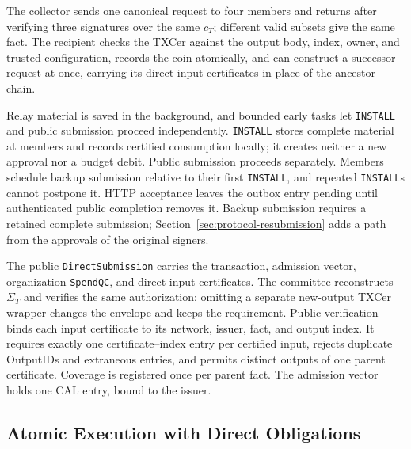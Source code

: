 The collector sends one canonical request to four members and returns after verifying three signatures over the same $c_T$; different valid subsets give the same fact. The recipient checks the TXCer against the output body, index, owner, and trusted configuration, records the coin atomically, and can construct a successor request at once, carrying its direct input certificates in place of the ancestor chain.

Relay material is saved in the background, and bounded early tasks let \texttt{INSTALL} and public submission proceed independently. \texttt{INSTALL} stores complete material at members and records certified consumption locally; it creates neither a new approval nor a budget debit. Public submission proceeds separately. Members schedule backup submission relative to their first \texttt{INSTALL}, and repeated \texttt{INSTALL}s cannot postpone it. HTTP acceptance leaves the outbox entry pending until authenticated public completion removes it. Backup submission requires a retained complete submission; Section~\ref{sec:protocol-resubmission} adds a path from the approvals of the original signers.

The public \texttt{DirectSubmission} carries the transaction, admission vector, organization \texttt{SpendQC}, and direct input certificates. The committee reconstructs $\Sigma_T$ and verifies the same authorization; omitting a separate new-output TXCer wrapper changes the envelope and keeps the requirement. Public verification binds each input certificate to its network, issuer, fact, and output index. It requires exactly one certificate--index entry per certified input, rejects duplicate OutputIDs and extraneous entries, and permits distinct outputs of one parent certificate. Coverage is registered once per parent fact. The admission vector holds one CAL entry, bound to the issuer.

\subsection{Atomic Execution with Direct Obligations}
\label{sec:protocol-execution}

